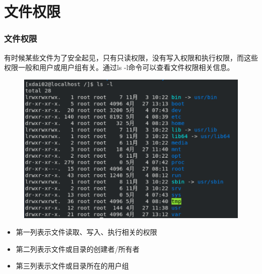 \documentclass[12pt, openany, oneside]{book}
\begin{document}
\begin{table}[H]
	\centering
	\caption{userdel参数说明}
\end{table}

\newpage

\section{文件权限}

\subsubsection{文件权限}

有时候某些文件为了安全起见，只有只读权限，没有写入权限和执行权限，而这些权限一般和用户或用户组有关。通过ls -l命令可以查看文件权限相关信息。

\begin{figure}[H]
	\centering
	\includegraphics[scale=0.7]{img/C5/5-2/1.png}
\end{figure}

\begin{itemize}
	\item 第一列表示文件读取、写入、执行相关的权限

	\item 第二列表示文件或目录的创建者/所有者

	\item 第三列表示文件或目录所在的用户组
\end{itemize}
\end{document}
